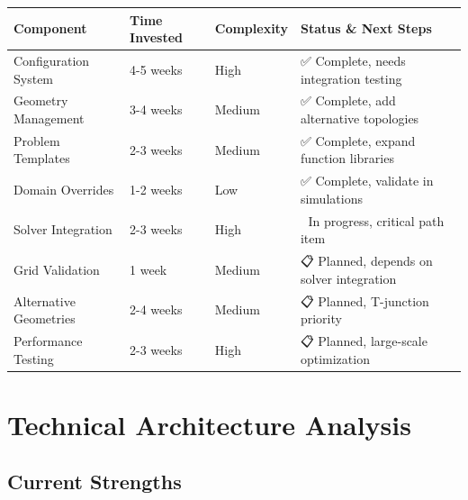 \documentclass[11pt,a4paper]{article}
\begin{document}
\begin{longtable}{|p{4cm}|p{3cm}|p{2cm}|p{5cm}|}
\hline
\textbf{Component} & \textbf{Time Invested} & \textbf{Complexity} & \textbf{Status \& Next Steps} \\
\hline
\endhead

Configuration System & 4-5 weeks & High & ✅ Complete, needs integration testing \\
\hline

Geometry Management & 3-4 weeks & Medium & ✅ Complete, add alternative topologies \\
\hline

Problem Templates & 2-3 weeks & Medium & ✅ Complete, expand function libraries \\
\hline

Domain Overrides & 1-2 weeks & Low & ✅ Complete, validate in simulations \\
\hline

Solver Integration & 2-3 weeks & High & 🔄 In progress, critical path item \\
\hline

Grid Validation & 1 week & Medium & 📋 Planned, depends on solver integration \\
\hline

Alternative Geometries & 2-4 weeks & Medium & 📋 Planned, T-junction priority \\
\hline

Performance Testing & 2-3 weeks & High & 📋 Planned, large-scale optimization \\
\hline

\end{longtable}

\section{Technical Architecture Analysis}

\subsection{Current Strengths}
\end{document}
